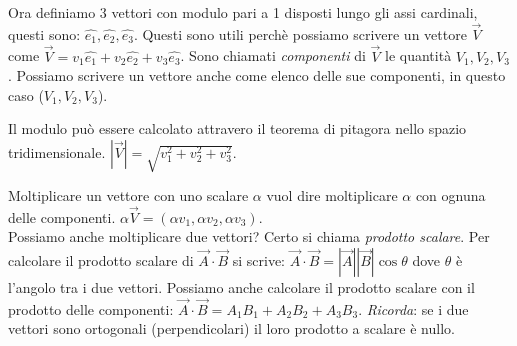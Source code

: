 \documentclass{article}
\begin{document}
\par\vspace{20em}  %
\noindent Ora definiamo 3 vettori con modulo pari a 1 disposti lungo gli assi cardinali, questi sono: \(\hat{e_1}, \hat{e_2}, \hat{e_3}\). Questi sono utili perchè possiamo scrivere un vettore \(\vec{V}\) come \(\vec{V}=v_1\hat{e_1}+v_2\hat{e_2}+v_3\hat{e_3}\). Sono chiamati \textit{componenti} di \(\vec{V}\) le quantità \(V_1,V_2,V_3\). Possiamo scrivere un vettore anche come elenco delle sue componenti, in questo caso (\(V_1,V_2,V_3\)).
\par\vspace{1em} Il modulo può essere calcolato attravero il teorema di pitagora nello spazio tridimensionale. \(|\vec{V}|=\sqrt{v_1^2+v_2^2+v_3^2}\).
\par\vspace{1em} Moltiplicare un vettore con uno scalare \(\alpha\) vuol dire moltiplicare \(\alpha\) con ognuna delle componenti. \(\alpha \vec{V}=(\alpha v_1,\alpha v_2, \alpha v_3)\). 
\vspace{1em} \\Possiamo anche moltiplicare due vettori? Certo si chiama \textit{prodotto scalare}. Per calcolare il prodotto scalare di  \(\vec{A}\cdot\vec{B}\) si scrive: \(\vec{A}\cdot\vec{B}=|\vec{A}||\vec{B}|\cos\theta\) dove \(\theta\) è l'angolo tra i due vettori. Possiamo anche calcolare il prodotto scalare con il prodotto delle componenti: \(\vec{A}\cdot\vec{B}=A_1B_1+A_2B_2+A_3B_3 \). \textit{Ricorda}: se i due vettori sono ortogonali (perpendicolari) il loro prodotto a scalare è nullo.

\pagebreak
\end{document}
